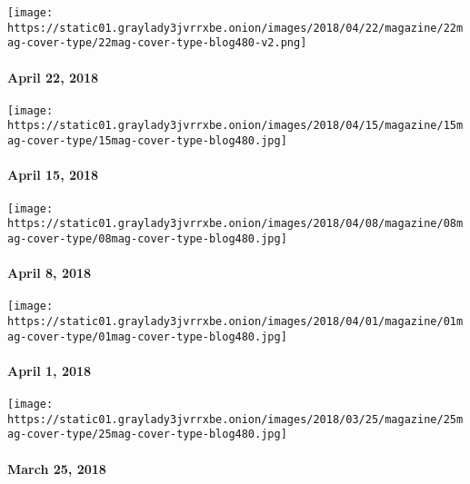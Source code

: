 \href{https://www.nytimes3xbfgragh.onion/issue/magazine/2018/05/04/42218-issue}{}

\texttt{[image: https://static01.graylady3jvrrxbe.onion/images/2018/04/22/magazine/22mag-cover-type/22mag-cover-type-blog480-v2.png]}

\hypertarget{april-22-2018}{%
\paragraph{April 22, 2018}\label{april-22-2018}}

\href{https://www.nytimes3xbfgragh.onion/issue/magazine/2018/04/12/41518-issue}{}

\texttt{[image: https://static01.graylady3jvrrxbe.onion/images/2018/04/15/magazine/15mag-cover-type/15mag-cover-type-blog480.jpg]}

\hypertarget{april-15-2018}{%
\paragraph{April 15, 2018}\label{april-15-2018}}

\href{https://www.nytimes3xbfgragh.onion/issue/magazine/2018/04/12/4818-issue}{}

\texttt{[image: https://static01.graylady3jvrrxbe.onion/images/2018/04/08/magazine/08mag-cover-type/08mag-cover-type-blog480.jpg]}

\hypertarget{april-8-2018}{%
\paragraph{April 8, 2018}\label{april-8-2018}}

\href{https://www.nytimes3xbfgragh.onion/issue/magazine/2018/03/30/4118-issue}{}

\texttt{[image: https://static01.graylady3jvrrxbe.onion/images/2018/04/01/magazine/01mag-cover-type/01mag-cover-type-blog480.jpg]}

\hypertarget{april-1-2018}{%
\paragraph{April 1, 2018}\label{april-1-2018}}

\href{https://www.nytimes3xbfgragh.onion/issue/magazine/2018/03/30/32518-issue}{}

\texttt{[image: https://static01.graylady3jvrrxbe.onion/images/2018/03/25/magazine/25mag-cover-type/25mag-cover-type-blog480.jpg]}

\hypertarget{march-25-2018}{%
\paragraph{March 25, 2018}\label{march-25-2018}}

